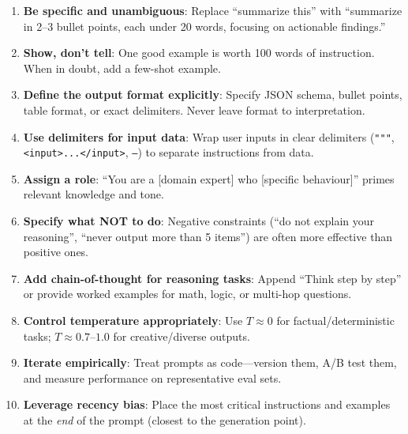 \begin{keybox}
\begin{enumerate}
  \item \textbf{Be specific and unambiguous}: Replace ``summarize this'' with ``summarize in 2--3 bullet points, each under 20 words, focusing on actionable findings.''
  \item \textbf{Show, don’t tell}: One good example is worth 100 words of instruction. When in doubt, add a few-shot example.
  \item \textbf{Define the output format explicitly}: Specify JSON schema, bullet points, table format, or exact delimiters. Never leave format to interpretation.
  \item \textbf{Use delimiters for input data}: Wrap user inputs in clear delimiters (\texttt{"""}, \texttt{<input>...</input>}, \texttt{---}) to separate instructions from data.
  \item \textbf{Assign a role}: ``You are a [domain expert] who [specific behaviour]'' primes relevant knowledge and tone.
  \item \textbf{Specify what NOT to do}: Negative constraints (``do not explain your reasoning'', ``never output more than 5 items'') are often more effective than positive ones.
  \item \textbf{Add chain-of-thought for reasoning tasks}: Append ``Think step by step'' or provide worked examples for math, logic, or multi-hop questions.
  \item \textbf{Control temperature appropriately}: Use $T \approx 0$ for factual/deterministic tasks; $T \approx 0.7$--$1.0$ for creative/diverse outputs.
  \item \textbf{Iterate empirically}: Treat prompts as code---version them, A/B test them, and measure performance on representative eval sets.
  \item \textbf{Leverage recency bias}: Place the most critical instructions and examples at the \emph{end} of the prompt (closest to the generation point).
\end{enumerate}
\end{keybox}

